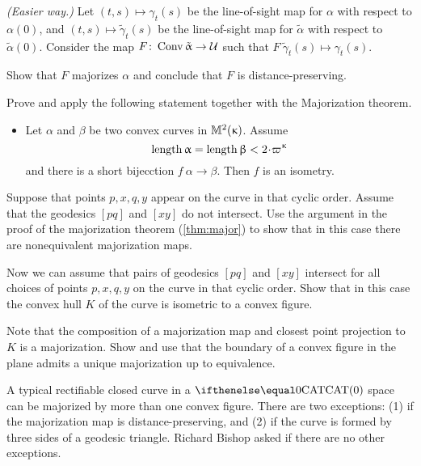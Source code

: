 \textit{(Easier way.)} 
Let 
$(t,s)\mapsto \gamma_t(s)$ be the line-of-sight map 
for $\alpha$ with respect to $\alpha(0)$,
and 
$(t,s)\mapsto \tilde \gamma_t(s)$ be the line-of-sight map 
for $\tilde \alpha$ with respect to $\tilde \alpha(0)$.
Consider the map  $F\:\Conv\tilde \alpha\to \spc{U}$ such that 
$F\:\tilde \gamma_t(s)\mapsto \gamma_t(s)$.

Show that $F$ majorizes $\alpha$
and conclude that $F$ is distance-preserving.

Prove and apply the following statement together with the Majorization theorem.
\begin{itemize}
\item Let $\alpha$ and $\beta$ be two convex curves in $\mathbb{M}_{{}}^{2}({\upkappa})$.
Assume 
\[\length \alpha=\length\beta<2\cdot\varpi\kappa\]
and there is a short bijecction $f\:\alpha\to\beta$.
Then $f$ is an isometry.
\end{itemize}

Suppose that points $p,x,q,y$ appear on the curve in that cyclic order.
Assume that the geodesics $[pq]$ and $[xy]$ do not intersect.
Use the argument in the proof of the majorization theorem (\ref{thm:major}) to show that in this case there are nonequivalent majorization maps.

Now we can assume that pairs of geodesics $[pq]$ and $[xy]$ intersect for all choices of points $p,x,q,y$ on the curve in that cyclic order.
Show that in this case the convex hull $K$ of the curve is isometric to a convex figure.

Note that the composition of a majorization map and closest point projection to $K$ is a majorization.
Show and use that the boundary of a convex figure in the plane admits a unique majorization up to equivalence.

A typical rectifiable closed curve in a $\CAT0$ space can be majorized by more than one convex figure.
There are two exceptions: (1) if the majorization map is distance-preserving, and (2) if the curve is  formed by three sides of a geodesic triangle.
Richard Bishop asked if there are no other exceptions.

